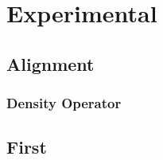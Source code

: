 


\frontmatter

\mainmatter
\chapter{Experimental}
\section{Alignment}
\subsection{Density Operator}

\begin{appendix}
\chapter{First}

\end{appendix}
\backmatter


